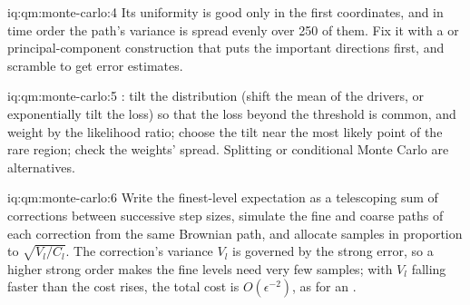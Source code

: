 \begin{solution}{iq:qm:monte-carlo:4}
Its uniformity is good only in the first coordinates, and in time order the path's variance is spread evenly over 250 of them. Fix it with a  or principal-component construction that
puts the important directions first, and scramble to get error estimates.
\end{solution}

\begin{solution}{iq:qm:monte-carlo:5}
: tilt the distribution (shift the mean of the drivers, or exponentially tilt the loss) so that the loss beyond the threshold is common, and weight by the likelihood ratio; choose the
tilt near the most likely point of the rare region; check the weights' spread. Splitting or conditional Monte Carlo are alternatives.
\end{solution}

\begin{solution}{iq:qm:monte-carlo:6}
Write the finest-level expectation as a telescoping sum of corrections between successive step sizes, simulate the fine and coarse paths of each correction from the same Brownian path, and allocate
samples in proportion to $\sqrt{V_l/C_l}$. The correction's variance $V_l$ is governed by the strong error, so a higher strong order makes the fine levels need very few samples; with $V_l$ falling
faster than the cost rises, the total cost is $O(\epsilon^{-2})$, as for an .
\end{solution}
